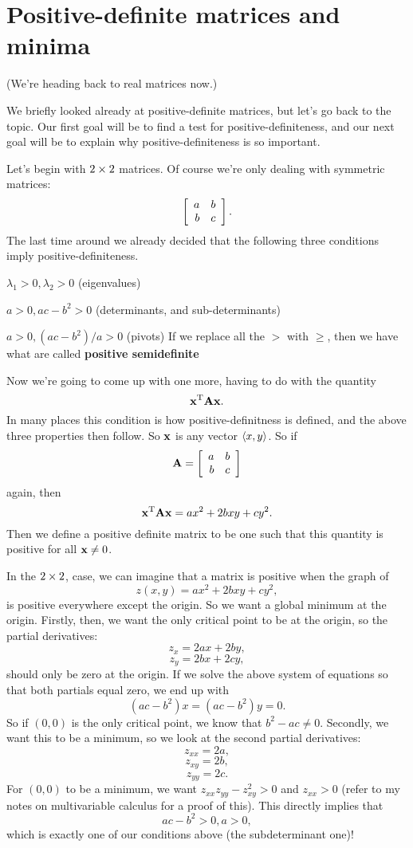 \section{Positive-definite matrices and minima}

(We're heading back to real matrices now.)

We briefly looked already at positive-definite matrices, but let's go back to the topic. Our first goal will be to find a test for positive-definiteness, and our next goal will be to explain why positive-definiteness is so important. 

Let's begin with $2 \times 2$ matrices. Of course we're only dealing with symmetric matrices: 
\[ \left[ \begin{array}{rrrrrrrrrrrrrrrrrrrrrrrrr} a&b\\b&c\\ \end{array} \right]. \]
The last time around we already decided that the following three conditions imply positive-definiteness.
\ben
\item $\lambda_1 > 0, \lambda_2 > 0$ (eigenvalues)
\item $a > 0, ac-b^2 > 0$ (determinants, and sub-determinants)
\item $a > 0, (ac-b^2)/a > 0$ (pivots)
\een
\brm
If we replace all the $>$ with $\ge$, then we have what are called \textbf{positive semidefinite}
\erm

Now we're going to come up with one more, having to do with the quantity 
\[ \boldsymbol{\mathbf{x}}^\mathrm{T} \boldsymbol{\mathbf{A}} \boldsymbol{\mathbf{x}}. \]
In many places this condition is how positive-definitness is defined, and the above three properties then follow. So $\boldsymbol{\mathbf{x}}$ is any vector $\langle x, y \rangle$. So if
\[ \boldsymbol{\mathbf{A}} = \left[ \begin{array}{rrrrrrrrrrrrrrrrrrrrrrrrr} a&b\\b&c\\ \end{array} \right] \]
again, then
\[ \boldsymbol{\mathbf{x}}^\mathrm{T} \boldsymbol{\mathbf{A}} \boldsymbol{\mathbf{x}} = ax^2 + 2bxy + cy^2. \]
Then we define a positive definite matrix to be one such that this quantity is positive for all $\boldsymbol{\mathbf{x}} \ne 0$.

In the $2 \times 2$, case, we can imagine that a matrix is positive when the graph of
\[ z(x,y) = ax^2 + 2bxy + cy^2, \]
is positive everywhere except the origin. So we want a global minimum at the origin. Firstly, then, we want the only critical point to be at the origin, so the partial derivatives:
\[ z_x = 2ax +2by, \]
\[ z_y = 2bx + 2cy, \]
should only be zero at the origin. If we solve the above system of equations so that both partials equal zero, we end up with
\[ (ac - b^2)x = (ac-b^2)y = 0. \]
So if $(0,0)$ is the only critical point, we know that $b^2-ac \ne 0$. Secondly, we want this to be a minimum, so we look at the second partial derivatives:
\[ z_{xx} = 2a, \]
\[ z_{xy} = 2b, \]
\[ z_{yy} = 2c. \]
For $(0,0)$ to be a minimum, we want $z_{xx}z_{yy} - z_{xy}^2 > 0$ and $z_{xx} > 0$ (refer to my notes on multivariable calculus for a proof of this). This directly implies that
\[ ac - b^2 > 0, a > 0, \]
which is exactly one of our conditions above (the subdeterminant one)! 

